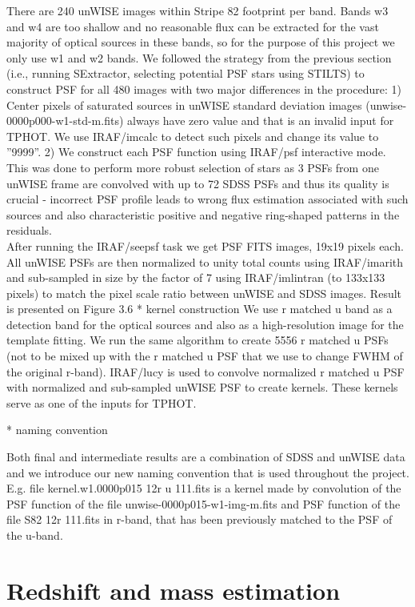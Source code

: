 \documentclass[numberedappendix,apj,twocolumn]{emulateapj}
\begin{document}
There are 240 unWISE images within Stripe 82 footprint per band. Bands w3 and w4
are too shallow and no reasonable flux can be extracted for the vast majority of
optical sources in these bands, so for the purpose of this project we only use w1
and w2 bands. We followed the strategy from the previous section (i.e., running SExtractor, selecting potential PSF stars using STILTS) to construct PSF for all 480 images with two major differences
in the procedure:
1) Center pixels of saturated sources in unWISE standard deviation images (unwise-
0000p000-w1-std-m.fits) always have zero value and that is an invalid input for TPHOT.
We use IRAF/imcalc to detect such pixels and change its value to ”9999”.
2) We construct each PSF function using IRAF/psf interactive mode. This was done to perform more robust selection of stars as 3 PSFs from one unWISE
frame are convolved with up to 72 SDSS PSFs and thus its quality is crucial - incorrect
PSF profile leads to wrong flux estimation associated with such sources and also
characteristic positive and negative ring-shaped patterns in the residuals.
\\
After running the IRAF/seepsf task we get PSF FITS images, 19x19 pixels each. All
unWISE PSFs are then normalized to unity total counts using IRAF/imarith and sub-sampled
in size by the factor of 7 using IRAF/imlintran (to 133x133 pixels) to match the pixel
scale ratio between unWISE and SDSS images. Result is presented on Figure 3.6	
	* kernel construction
We use r matched u band as a detection band for the optical sources and also as a high-resolution image for the template fitting. We run the same algorithm to create 5556 r matched u PSFs (not to be mixed up with the r matched u PSF that we use to change FWHM of the original r-band). IRAF/lucy is used to convolve normalized r matched u PSF with normalized and sub-sampled unWISE PSF to create kernels. These kernels serve as one of the inputs for TPHOT.

* naming convention

Both final and intermediate results are a combination of SDSS and unWISE data and
we introduce our new naming convention that is used throughout the project. E.g. file
kernel.w1.0000p015 12r u 111.fits is a kernel made by convolution of the PSF function
of the file unwise-0000p015-w1-img-m.fits and PSF function of the file S82 12r 111.fits
in r-band, that has been previously matched to the PSF of the u-band.


\section{Redshift and mass estimation}
\end{document}
